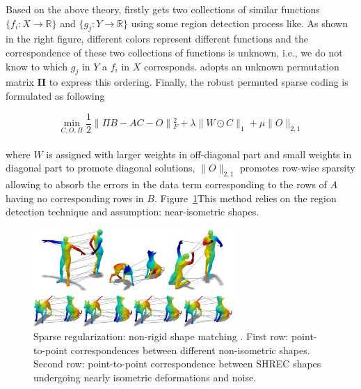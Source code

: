 Based on the above theory, \cite{pokrass2013sparse} firstly gets two collections of similar functions $\{f_{i}:X\to \mathbb{R}\}$ and $\{g_{j}:Y\to \mathbb{R}\}$ using some region detection process like\cite{litman2011diffusion}. As shown in the right figure, different colors represent different functions and the correspondence of these two collections of functions is unknown, i.e., we do not know to which $g_{j}$ in $Y$ a $f_{i}$ in $X$ corresponds.
\cite{pokrass2013sparse} adopts an unknown permutation matrix $\mathbf{\Pi}$ to express this ordering. Finally, the robust permuted sparse coding is formulated as following

\small{
\begin{equation}
 \label{eq:non-rigid shape matching}
 \min_{C,O,\Pi}\frac{1}{2} \|\Pi B - AC - O \|{_{F}^2} + \lambda\| W \odot C\|_1+\mu\|O\|_{2,1}
\end{equation}
}
\\
where $W$ is assigned with larger weights in off-diagonal part and small weights in diagonal part to promote diagonal solutions, $\|O\|_{2,1}$ promotes row-wise sparsity allowing to absorb the errors in the data term corresponding to the rows of $A$ having no corresponding rows in $B$.
Figure~\ref{fig:non-rigid matching}This method relies on the region detection technique and assumption: near-isometric shapes.

\begin{figure}[ht]
  \centering
  \includegraphics[width=3in]{images/matching_L1}
  \caption{Sparse regularization: non-rigid shape matching \cite{wang2014decoupling}. First row: point-to-point correspondences between different non-isometric shapes. Second row: point-to-point correspondence between SHREC shapes undergoing nearly isometric deformations and noise.}
  \label{fig:non-rigid matching}
\end{figure}


